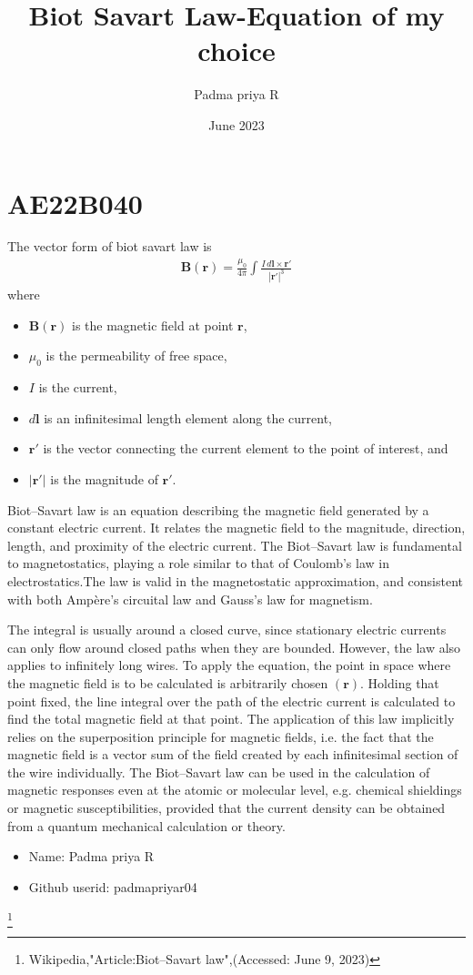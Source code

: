 \documentclass{article}
\title{Biot Savart Law-Equation of my choice}
\author{Padma priya R }
\date{June 2023}
\begin{document}
\maketitle
\section{AE22B040}
The vector form of biot savart law is 
\begin{align*}
    \mathbf{B}(\mathbf{r}) =\frac{\mu_0}{4\pi} \int \frac{I\, d\mathbf{l} \times \mathbf{r'}}{|\mathbf{r'}|^3}
\end{align*}
where
\begin{itemize}
  \item $\mathbf{B}(\mathbf{r})$ is the magnetic field at point $\mathbf{r}$,
  \item $\mu_0$ is the permeability of free space,
  \item $I$ is the current,
  \item $d\mathbf{l}$ is an infinitesimal length element along the current,
  \item $\mathbf{r'}$ is the vector connecting the current element to the point of interest, and
  \item $|\mathbf{r'}|$ is the magnitude of $\mathbf{r'}$.
\end{itemize}

Biot–Savart law is an equation describing the magnetic field generated by a constant electric current. It relates the magnetic field to the magnitude, direction, length, and proximity of the electric current. The Biot–Savart law is fundamental to magnetostatics, playing a role similar to that of Coulomb's law in electrostatics.The law is valid in the magnetostatic approximation, and consistent with both Ampère's circuital law and Gauss's law for magnetism.



The integral is usually around a closed curve, since stationary electric currents can only flow around closed paths when they are bounded. However, the law also applies to infinitely long wires.
To apply the equation, the point in space where the magnetic field is to be calculated is arbitrarily chosen $(\mathbf {r} )$. Holding that point fixed, the line integral over the path of the electric current is calculated to find the total magnetic field at that point. The application of this law implicitly relies on the superposition principle for magnetic fields, i.e. the fact that the magnetic field is a vector sum of the field created by each infinitesimal section of the wire individually.
The Biot–Savart law can be used in the calculation of magnetic responses even at the atomic or molecular level, e.g. chemical shieldings or magnetic susceptibilities, provided that the current density can be obtained from a quantum mechanical calculation or theory.
\begin{itemize}
  \item Name: Padma priya R
  \item Github userid: padmapriyar04
\end{itemize}
\footnote{Wikipedia,"Article:Biot–Savart law",(Accessed: June 9, 2023)}
\end{document}
